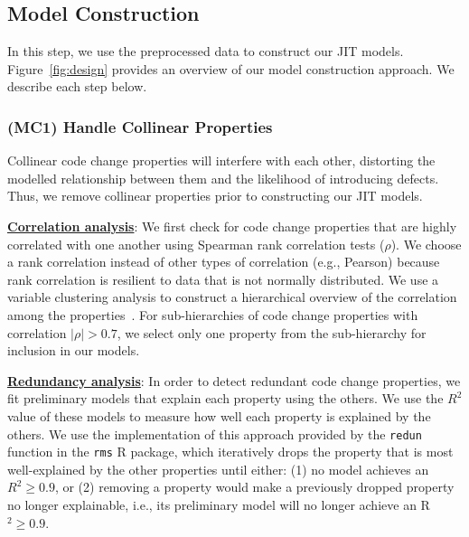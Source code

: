 \subsection{Model Construction}
\label{sec:mc}

In this step, we use the preprocessed data to construct our JIT models.
Figure~\ref{fig:design} provides an overview of our model construction approach.
We describe each step below.

\subsubsection*{(MC1) Handle Collinear Properties}
Collinear code change properties will interfere with each other, distorting the modelled relationship between them and the likelihood of introducing defects.
Thus, we remove collinear properties prior to constructing our JIT models.

\underline{\bf Correlation analysis}:
We first check for code change properties that are highly correlated with one another using Spearman rank correlation tests ($\rho$).
We choose a rank correlation instead of other types of correlation (e.g., Pearson) because rank correlation is resilient to data that is not normally distributed.
We use a variable clustering analysis to construct a hierarchical overview of the correlation among the properties~\cite{varclus}.
For sub-hierarchies of code change properties with correlation $|\rho| > 0.7$, we select only one property from the sub-hierarchy for inclusion in our models.

\underline{\bf Redundancy analysis}:
In order to detect redundant code change properties, we fit preliminary models that explain each property using the others.
We use the $R^2$ value of these models to measure how well each property is explained by the others.
We use the implementation of this approach provided by the {\tt redun} function in the {\tt rms} R package, which iteratively drops the property that is most well-explained by the other properties until either:
(1) no model achieves an $R^2 \ge 0.9$,
or (2) removing a property would make a previously dropped property no longer explainable, i.e., its preliminary model will no longer achieve an R$^2 \ge 0.9$.

